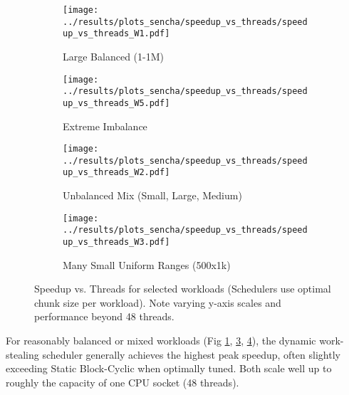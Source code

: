 \documentclass[10pt]{article}
\begin{document}
\begin{figure}[H]
    \centering
    \begin{subfigure}[b]{0.49\textwidth}
        \centering
        \texttt{[image: ../results/plots\_sencha/speedup\_vs\_threads/speedup\_vs\_threads\_W1.pdf]}
        \caption{Large Balanced (1-1M)}
        \label{fig:speedup_large_balanced}
    \end{subfigure}
    \hfill %
    \begin{subfigure}[b]{0.49\textwidth}
        \centering
        \texttt{[image: ../results/plots\_sencha/speedup\_vs\_threads/speedup\_vs\_threads\_W5.pdf]}
        \caption{Extreme Imbalance}
        \label{fig:speedup_extreme_imbalance}
    \end{subfigure}

    \vspace{1em} %

    \begin{subfigure}[b]{0.49\textwidth}
        \centering
        \texttt{[image: ../results/plots\_sencha/speedup\_vs\_threads/speedup\_vs\_threads\_W2.pdf]}
        \caption{Unbalanced Mix (Small, Large, Medium)}
        \label{fig:speedup_unbalanced_mix}
    \end{subfigure}
    \hfill %
    \begin{subfigure}[b]{0.49\textwidth}
        \centering
        \texttt{[image: ../results/plots\_sencha/speedup\_vs\_threads/speedup\_vs\_threads\_W3.pdf]}
        \caption{Many Small Uniform Ranges (500x1k)}
        \label{fig:speedup_many_small}
    \end{subfigure}

    \caption{Speedup vs. Threads for selected workloads (Schedulers use optimal chunk size per workload). Note varying y-axis scales and performance beyond 48 threads.}
    \label{fig:speedup_comparison_grid}
\end{figure}

For reasonably balanced or mixed workloads (Fig \ref{fig:speedup_large_balanced}, \ref{fig:speedup_unbalanced_mix}, \ref{fig:speedup_many_small}), the dynamic work-stealing scheduler generally achieves the highest peak speedup, often slightly exceeding Static Block-Cyclic when optimally tuned. Both scale well up to roughly the capacity of one CPU socket (48 threads).
\end{document}
